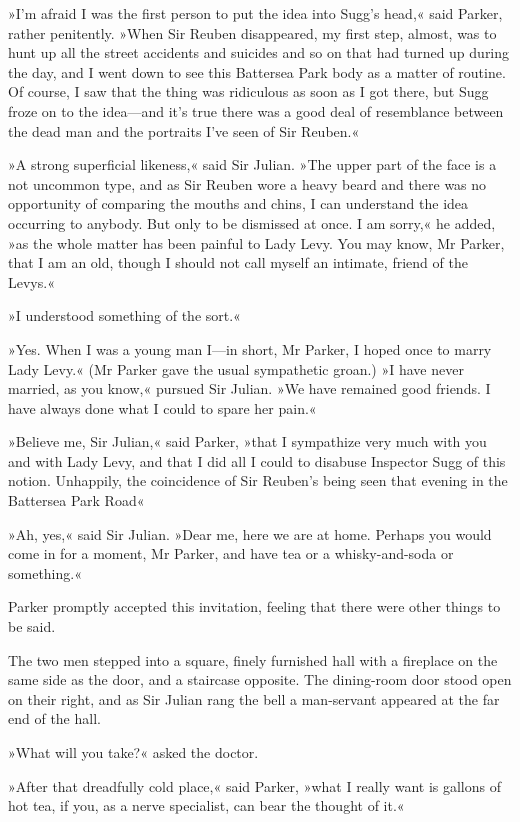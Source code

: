»I'm afraid I was the first person to put the idea into Sugg's head,« said Parker, rather penitently. »When Sir Reuben disappeared, my first step, almost, was to hunt up all the street accidents and suicides and so on that had turned up during the day, and I went down to see this Battersea Park body as a matter of routine. Of course, I saw that the thing was ridiculous as soon as I got there, but Sugg froze on to the idea—and it's true there was a good deal of resemblance between the dead man and the portraits I've seen of Sir Reuben.«

»A strong superficial likeness,« said Sir Julian. »The upper part of the face is a not uncommon type, and as Sir Reuben wore a heavy beard and there was no opportunity of comparing the mouths and chins, I can understand the idea occurring to anybody. But only to be dismissed at once. I am sorry,« he added, »as the whole matter has been painful to Lady Levy. You may know, Mr Parker, that I am an old, though I should not call myself an intimate, friend of the Levys.«

»I understood something of the sort.«

»Yes. When I was a young man I—in short, Mr Parker, I hoped once to marry Lady Levy.« (Mr Parker gave the usual sympathetic groan.) »I have never married, as you know,« pursued Sir Julian. »We have remained good friends. I have always done what I could to spare her pain.«

»Believe me, Sir Julian,« said Parker, »that I sympathize very much with you and with Lady Levy, and that I did all I could to disabuse Inspector Sugg of this notion. Unhappily, the coincidence of Sir Reuben's being seen that evening in the Battersea Park Road\longdash«

»Ah, yes,« said Sir Julian. »Dear me, here we are at home. Perhaps you would come in for a moment, Mr Parker, and have tea or a whisky-and-soda or something.«

Parker promptly accepted this invitation, feeling that there were other things to be said.

The two men stepped into a square, finely furnished hall with a fireplace on the same side as the door, and a staircase opposite. The dining-room door stood open on their right, and as Sir Julian rang the bell a man-servant appeared at the far end of the hall.

»What will you take?« asked the doctor.

»After that dreadfully cold place,« said Parker, »what I really want is gallons of hot tea, if you, as a nerve specialist, can bear the thought of it.«

